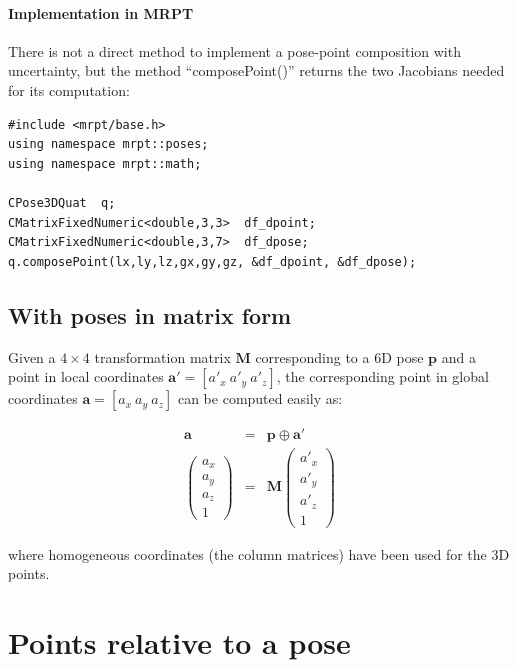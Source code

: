 \documentclass[a4paper,10pt]{report}
\begin{document}
\subsubsection{Implementation in MRPT}

There is not a direct method to implement a pose-point composition with uncertainty, 
but the method ``composePoint()'' returns the two Jacobians needed for its computation:

\begin{lstlisting}
#include <mrpt/base.h> 
using namespace mrpt::poses; 
using namespace mrpt::math; 

CPose3DQuat  q;
CMatrixFixedNumeric<double,3,3>  df_dpoint;
CMatrixFixedNumeric<double,3,7>  df_dpose;
q.composePoint(lx,ly,lz,gx,gy,gz, &df_dpoint, &df_dpose);
\end{lstlisting}



\section{With poses in matrix form}
\label{sect:comp_point:mat}

Given a $4\times 4$ transformation matrix $\mathbf{M}$ corresponding to a 6D pose 
$\mathbf{p}$ and a point in local coordinates 
$\mathbf{a'} = [a'_x ~ a'_y ~ a'_z]$, the corresponding point in global coordinates
$\mathbf{a} = [a_x ~ a_y ~ a_z]$ can be computed easily as:

\begin{eqnarray}
\mathbf{a} &=& \mathbf{p} \oplus \mathbf{a'} \nonumber \\
\left(\begin{array}{c}
 a_x \\ a_y \\ a_z \\ 1
\end{array}\right)
&=&
\mathbf{M} 
\left(\begin{array}{c}
 a'_x \\ a'_y \\ a'_z \\ 1
\end{array}\right)
\end{eqnarray}

\noindent where homogeneous coordinates (the column matrices) have been used for the 3D points.




\chapter{Points relative to a pose}
\end{document}
